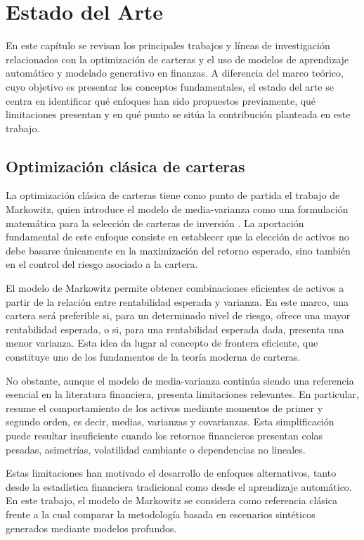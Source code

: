 \clearpage
\chapter{Estado del Arte}

En este capítulo se revisan los principales trabajos y líneas de investigación relacionados con la optimización de carteras y el uso de modelos de aprendizaje automático y modelado generativo en finanzas. A diferencia del marco teórico, cuyo objetivo es presentar los conceptos fundamentales, el estado del arte se centra en identificar qué enfoques han sido propuestos previamente, qué limitaciones presentan y en qué punto se sitúa la contribución planteada en este trabajo.

\section{Optimización clásica de carteras}

La optimización clásica de carteras tiene como punto de partida el trabajo de Markowitz, quien introduce el modelo de media-varianza como una formulación matemática para la selección de carteras de inversión \cite{markowitz1952}. La aportación fundamental de este enfoque consiste en establecer que la elección de activos no debe basarse únicamente en la maximización del retorno esperado, sino también en el control del riesgo asociado a la cartera.

El modelo de Markowitz permite obtener combinaciones eficientes de activos a partir de la relación entre rentabilidad esperada y varianza. En este marco, una cartera será preferible si, para un determinado nivel de riesgo, ofrece una mayor rentabilidad esperada, o si, para una rentabilidad esperada dada, presenta una menor varianza. Esta idea da lugar al concepto de frontera eficiente, que constituye uno de los fundamentos de la teoría moderna de carteras.

No obstante, aunque el modelo de media-varianza continúa siendo una referencia esencial en la literatura financiera, presenta limitaciones relevantes. En particular, resume el comportamiento de los activos mediante momentos de primer y segundo orden, es decir, medias, varianzas y covarianzas. Esta simplificación puede resultar insuficiente cuando los retornos financieros presentan colas pesadas, asimetrías, volatilidad cambiante o dependencias no lineales.

Estas limitaciones han motivado el desarrollo de enfoques alternativos, tanto desde la estadística financiera tradicional como desde el aprendizaje automático. En este trabajo, el modelo de Markowitz se considera como referencia clásica frente a la cual comparar la metodología basada en escenarios sintéticos generados mediante modelos profundos.

